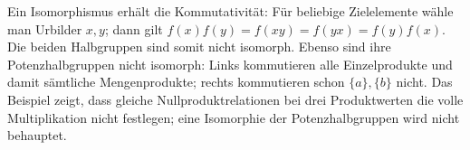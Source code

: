 Ein Isomorphismus erhält die Kommutativität: Für beliebige Zielelemente
wähle man Urbilder \(x,y\); dann gilt
\(f(x)f(y)=f(xy)=f(yx)=f(y)f(x)\). Die beiden Halbgruppen sind
somit nicht isomorph. Ebenso sind ihre Potenzhalbgruppen nicht isomorph:
Links kommutieren alle Einzelprodukte und damit sämtliche Mengenprodukte;
rechts kommutieren schon \(\{a\},\{b\}\) nicht. Das Beispiel zeigt,
dass gleiche Nullproduktrelationen bei drei Produktwerten die volle
Multiplikation nicht festlegen; eine Isomorphie der Potenzhalbgruppen
wird nicht behauptet.
